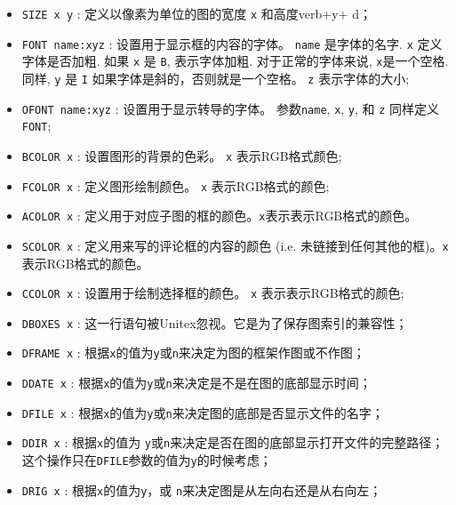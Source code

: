 \begin{itemize}
  \item \verb+SIZE x y+ : 定义以像素为单位的图的宽度  \verb+x+ 和高度verb+y+ d；
  
  \item \verb+FONT name:xyz+ : 设置用于显示框的内容的字体。
  	  \verb+name+ 是字体的名字. \verb+x+ 定义字体是否加粗. 如果 \verb+x+ 是 \verb+B+, 表示字体加粗. 对于正常的字体来说, \verb+x+是一个空格. 同样, \verb+y+ 是
  	  \verb+I+ 如果字体是斜的，否则就是一个空格。 \verb+z+ 表示字体的大小;

  \item \verb+OFONT name:xyz+ : 设置用于显示转导的字体。
  参数\verb+name+, \verb+x+, \verb+y+, 和 \verb+z+ 同样定义 \verb+FONT+;
  
  \item \verb+BCOLOR x+ : 设置图形的背景的色彩。 \verb+x+ 表示RGB格式颜色;
  \item \verb+FCOLOR x+ : 定义图形绘制颜色。 \verb+x+ 表示RGB格式的颜色;

  \item \verb+ACOLOR x+ : 
  定义用于对应子图的框的颜色。\verb+x+表示表示RGB格式的颜色。

  \item \verb+SCOLOR x+ :
定义用来写的评论框的内容的颜色 (i.e. 未链接到任何其他的框)。\verb+x+表示RGB格式的颜色。


  \item \verb+CCOLOR x+ : 设置用于绘制选择框的颜色。 
  \verb+x+ 表示表示RGB格式的颜色;

  \item \verb+DBOXES x+ : 
  这一行语句被Unitex忽视。它是为了保存图索引的兼容性；

  \item \verb+DFRAME x+ : 
  根据\verb+x+的值为\verb+y+或\verb+n+来决定为图的框架作图或不作图；


  \item \verb+DDATE x+ : 
  根据\verb+x+的值为\verb+y+或\verb+n+来决定是不是在图的底部显示时间；


  \item \verb+DFILE x+ : 
  根据\verb+x+的值为\verb+y+或\verb+n+来决定图的底部是否显示文件的名字；


  \item \verb+DDIR x+ : 
  根据\verb+x+的值为 \verb+y+或\verb+n+来决定是否在图的底部显示打开文件的完整路径；
  这个操作只在\verb+DFILE+参数的值为\verb+y+的时候考虑；

  \item \verb+DRIG x+ : 
  根据\verb+x+的值为\verb+y+，或 \verb+n+来决定图是从左向右还是从右向左；



\end{itemize}
